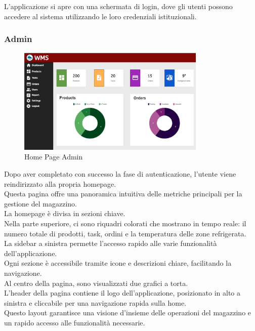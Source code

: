 L'applicazione si apre con una schermata di login, dove gli utenti possono accedere al sistema utilizzando le loro
credenziali istituzionali.
\newpage
\subsubsection{Admin}

\begin{figure}[H]
    \centering
    \includegraphics[width=0.8\textwidth]{document/sections/img/homePageAdmin.png}
    \caption{Home Page Admin}
    \label{fig:homePageAdmin}
\end{figure}

Dopo aver completato con successo la fase di autenticazione, l'utente viene reindirizzato alla propria homepage.\\
Questa pagina offre una panoramica intuitiva delle metriche principali per la gestione del magazzino.\\
La homepage è divisa in sezioni chiave.\\ Nella parte superiore, ci sono riquadri colorati che mostrano in tempo reale:
il numero totale di prodotti, task, ordini e la temperatura delle zone refrigerata.\\
La sidebar a sinistra permette l'accesso rapido alle varie funzionalità dell'applicazione.\\
Ogni sezione è accessibile tramite icone e descrizioni chiare, facilitando la navigazione.\\
Al centro della pagina, sono visualizzati due grafici a torta.\\
L'header della pagina contiene il logo dell'applicazione, posizionato in alto a sinistra e cliccabile per una navigazione rapida sulla home.\\
Questo layout garantisce una visione d'insieme delle operazioni del magazzino e un rapido accesso alle funzionalità
necessarie.

